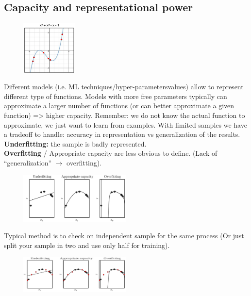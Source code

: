 \subsection{Capacity and representational power}

\begin{figure}
	\includegraphics[width=0.25\textwidth]{figure_ml/capacity.png}
\end{figure} 

Different models (i.e. ML techniques/hyper-parametersvalues) allow to represent different type of functions.
Models with more free parameters typically can approximate a larger number
of functions (or can better approximate a given function) => higher capacity.
Remember: we do not know the actual function to approximate, we just want
to learn from examples.
With limited samples we have a tradeoff to
handle: accuracy in representation vs generalization of the results.\\


\noindent
\textbf{Underfitting:} the sample is badly represented.\\
\textbf{Overfitting} / Appropriate capacity are less obvious to define. (Lack of “generalization” $\rightarrow$ overfitting).

\begin{figure}[ht]
	\centering
	\includegraphics[width=0.5\textwidth]{figure_ml/u_a_o.png}
\end{figure}
\FloatBarrier

Typical method is to check on independent sample for the same process (Or just split your sample in two and use only half for training).

\begin{figure}
	\centering
	\includegraphics[width=0.5\textwidth]{figure_ml/u_a_o2.png}
\end{figure}
\FloatBarrier

